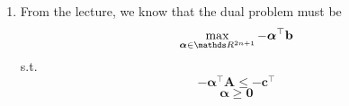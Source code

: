 \documentclass[a4paper]{article}
\makeatletter
\newcommand{\hlnum}[1]{\textcolor[rgb]{0.686,0.059,0.569}{#1}}%
\newcommand{\hlstr}[1]{\textcolor[rgb]{0.192,0.494,0.8}{#1}}%
\newcommand{\hlopt}[1]{\textcolor[rgb]{0,0,0}{#1}}%
\newcommand{\hlstd}[1]{\textcolor[rgb]{0.345,0.345,0.345}{#1}}%
\newcommand{\hlkwc}[1]{\textcolor[rgb]{0.333,0.667,0.333}{#1}}%
\newcommand{\hlkwd}[1]{\textcolor[rgb]{0.737,0.353,0.396}{\textbf{#1}}}%
\newenvironment{kframe}{%
 \def\at@end@of@kframe{}%
 \ifinner\ifhmode%
  \def\at@end@of@kframe{\end{minipage}}%
  \begin{minipage}{\columnwidth}%
 \fi\fi%
 \def\FrameCommand##1{\hskip\@totalleftmargin \hskip-\fboxsep
 \colorbox{shadecolor}{##1}\hskip-\fboxsep
     \hskip-\linewidth \hskip-\@totalleftmargin \hskip\columnwidth}%
 \MakeFramed {\advance\hsize-\width
   \@totalleftmargin\z@ \linewidth\hsize
   \@setminipage}}%
 {\par\unskip\endMakeFramed%
 \at@end@of@kframe}
\newenvironment{knitrout}{}{} %
\makeatother
\begin{document}
{\begin{enumerate}
\begin{knitrout}
\begin{kframe}
\begin{alltt}
\hlkwd{ggplot}\hlstd{(}\hlkwd{data.frame}\hlstd{(}\hlkwc{x} \hlstd{= x,} \hlkwc{y} \hlstd{= y),} \hlkwd{aes}\hlstd{(}\hlkwc{x}\hlstd{=x,} \hlkwc{y}\hlstd{=y))} \hlopt{+}
 \hlkwd{geom_point}\hlstd{()} \hlopt{+}
 \hlkwd{geom_abline}\hlstd{(}\hlkwc{intercept} \hlstd{= beta[}\hlnum{1}\hlstd{],} \hlkwc{slope} \hlstd{= beta[}\hlnum{2}\hlstd{])}
\end{alltt}
\end{kframe}
\texttt{[image: figure/remp-lpsolve-1]} 
\begin{kframe}\begin{alltt}
\hlstd{remp_plot} \hlopt{+}   \hlkwd{geom_point}\hlstd{(}\hlkwc{data}\hlstd{=}\hlkwd{data.frame}\hlstd{(}\hlkwc{x} \hlstd{= beta[}\hlnum{1}\hlstd{],} \hlkwc{y} \hlstd{= beta[}\hlnum{2}\hlstd{]),}
            \hlkwd{aes}\hlstd{(}\hlkwc{x}\hlstd{=x,} \hlkwc{y}\hlstd{=y),} \hlkwc{color}\hlstd{=}\hlstr{"lightblue"}\hlstd{)}
\end{alltt}
\end{kframe}
\texttt{[image: figure/remp-lpsolve-2]} 
\end{knitrout}
\item From the lecture, we know that the dual problem must be
$$\max_{\bm{\alpha} \in \R^{2n + 1}} -\bm{\alpha}^\top\mathbf{b}$$ 
s.t.
$$-\bm{\alpha}^\top \mathbf{A} \leq -\mathbf{c}^\top$$
$$\bm{\alpha} \geq \mathbf{0}$$
\end{enumerate}
}
\end{document}
